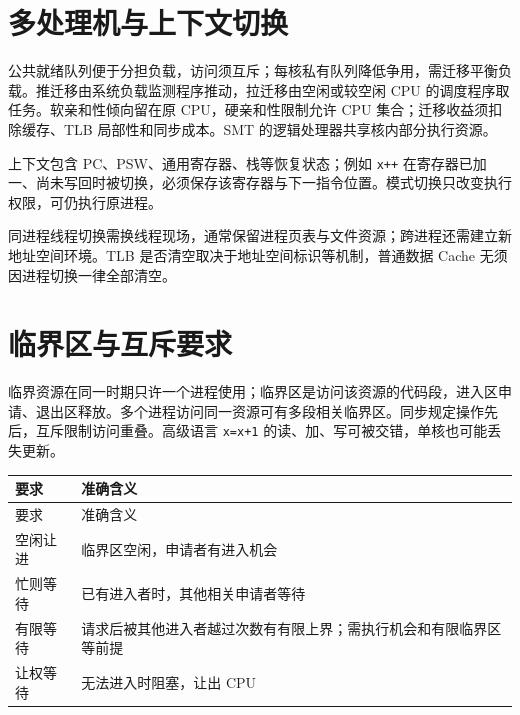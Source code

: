 \section{多处理机与上下文切换}\label{OS02-context}

公共就绪队列便于分担负载，访问须互斥；每核私有队列降低争用，需迁移平衡负载。推迁移由系统负载监测程序推动，拉迁移由空闲或较空闲 CPU 的调度程序取任务。软亲和性倾向留在原 CPU，硬亲和性限制允许 CPU 集合；迁移收益须扣除缓存、TLB 局部性和同步成本。SMT 的逻辑处理器共享核内部分执行资源。

上下文包含 PC、PSW、通用寄存器、栈等恢复状态；例如 \texttt{x+\allowbreak{}+\allowbreak{}} 在寄存器已加一、尚未写回时被切换，必须保存该寄存器与下一指令位置。模式切换只改变执行权限，可仍执行原进程。

同进程线程切换需换线程现场，通常保留进程页表与文件资源；跨进程还需建立新地址空间环境。TLB 是否清空取决于地址空间标识等机制，普通数据 Cache 无须因进程切换一律全部清空。

\section{临界区与互斥要求}\label{OS02-critical-section}

临界资源在同一时期只许一个进程使用；临界区是访问该资源的代码段，进入区申请、退出区释放。多个进程访问同一资源可有多段相关临界区。同步规定操作先后，互斥限制访问重叠。高级语言 \texttt{x=\allowbreak{}x+\allowbreak{}1} 的读、加、写可被交错，单核也可能丢失更新。

\par\smallskip
{\fontsize{9.3}{12}\selectfont\setlength{\tabcolsep}{2.5pt}\setlength{\LTleft}{0pt}\setlength{\LTright}{0pt}
\begin{longtable}{@{}>{\raggedright\arraybackslash}p{}>{\raggedright\arraybackslash}p{}@{}}
\toprule
要求 & 准确含义 \\

\midrule\endfirsthead\toprule
要求 & 准确含义 \\

\midrule\endhead\bottomrule\endfoot
空闲让进 & 临界区空闲，申请者有进入机会 \\

忙则等待 & 已有进入者时，其他相关申请者等待 \\

有限等待 & 请求后被其他进入者越过次数有有限上界；需执行机会和有限临界区等前提 \\

让权等待 & 无法进入时阻塞，让出 CPU \\

\end{longtable}}
\par\smallskip

